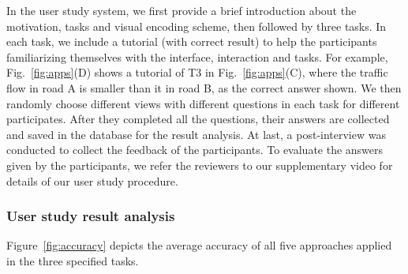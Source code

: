 In the user study system, we first provide a brief introduction about the motivation, tasks and visual encoding scheme, then followed by three tasks.
In each task, we include a tutorial (with correct result) to help the participants familiarizing themselves with the interface, interaction and tasks.
For example, Fig.~\ref{fig:apps}(D) shows a tutorial of T3 in Fig.~\ref{fig:apps}(C), where the traffic flow in road A is smaller than it in road B, as the correct answer shown.
We then randomly choose different views with different questions in each task for different participates.
After they completed all the questions, their answers are collected and saved in the database for the result analysis.
At last, a post-interview was conducted to collect the feedback of the participants.
To evaluate the answers given by the participants, we refer the reviewers to our supplementary video for details of our user study procedure.


\subsubsection{User study result analysis}\label{sec:uret}
Figure~\ref{fig:accuracy} depicts the average accuracy of all five approaches applied in the three specified tasks.



